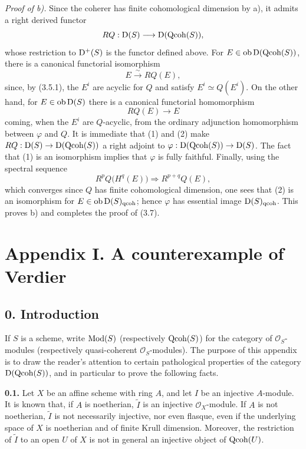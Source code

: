 \documentclass[11pt]{article}
\begin{document}
\emph{Proof of b).} Since the coherer has finite cohomological dimension by a), it admits a right derived functor
\[
RQ:\mathrm D(S)\longrightarrow\mathrm D(\operatorname{Qcoh}(S)),
\]
whose restriction to $\mathrm D^+(S)$ is the functor defined above. For $E\in\operatorname{ob}\mathrm D(\operatorname{Qcoh}(S))$, there is a canonical functorial isomorphism
\begin{equation}\tag{1}
E\xrightarrow{\sim} RQ(E),
\end{equation}
since, by (3.5.1), the $E^i$ are acyclic for $Q$ and satisfy $E^i\simeq Q(E^i)$. On the other hand, for $E\in\operatorname{ob}\mathrm D(S)$ there is a canonical functorial homomorphism
\begin{equation}\tag{2}
RQ(E)\longrightarrow E
\end{equation}
coming, when the $E^i$ are $Q$-acyclic, from the ordinary adjunction homomorphism between $\varphi$ and $Q$. It is immediate that (1) and (2) make $RQ:\mathrm D(S)\to\mathrm D(\operatorname{Qcoh}(S))$ a right adjoint to $\varphi:\mathrm D(\operatorname{Qcoh}(S))\to\mathrm D(S)$. The fact that (1) is an isomorphism implies that $\varphi$ is fully faithful. Finally, using the spectral sequence
\[
R^pQ\bigl(H^q(E)\bigr)\Longrightarrow R^{p+q}Q(E),
\]
which converges since $Q$ has finite cohomological dimension, one sees that (2) is an isomorphism for $E\in\operatorname{ob}\mathrm D(S)_{\mathrm{qcoh}}$; hence $\varphi$ has essential image $\mathrm D(S)_{\mathrm{qcoh}}$. This proves b) and completes the proof of (3.7).

\section*{Appendix I. A counterexample of Verdier}

\subsection*{0. Introduction}
If $S$ is a scheme, write $\operatorname{Mod}(S)$ (respectively $\operatorname{Qcoh}(S)$) for the category of $\mathcal O_S$-modules (respectively quasi-coherent $\mathcal O_S$-modules). The purpose of this appendix is to draw the reader's attention to certain pathological properties of the category $\mathrm D(\operatorname{Qcoh}(S))$, and in particular to prove the following facts.

\textbf{0.1.} Let $X$ be an affine scheme with ring $A$, and let $I$ be an injective $A$-module. It is known that, if $A$ is noetherian, $\widetilde I$ is an injective $\mathcal O_X$-module. If $A$ is not noetherian, $\widetilde I$ is not necessarily injective, nor even flasque, even if the underlying space of $X$ is noetherian and of finite Krull dimension. Moreover, the restriction of $\widetilde I$ to an open $U$ of $X$ is not in general an injective object of $\operatorname{Qcoh}(U)$.
\end{document}
